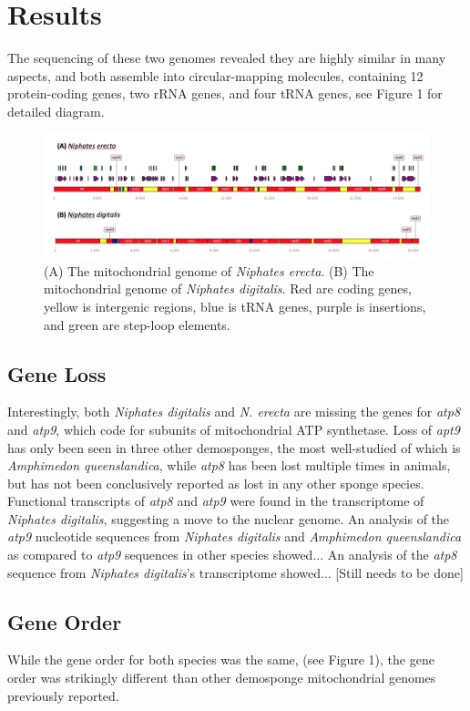 \documentclass[../main.tex]{subfiles}
\begin{document}
\section{Results}

The sequencing of these two genomes revealed they are highly similar in many aspects, and both assemble into circular-mapping molecules, containing 12 protein-coding genes, two rRNA genes, and four tRNA genes, see Figure 1 for detailed diagram.

\begin{figure}[htp]
    \centering
    \includegraphics[width=1.0\textwidth]{Figures/figure 1.png}
    \caption{(A) The mitochondrial genome of \emph{Niphates erecta}. (B) The mitochondrial genome of \emph{Niphates digitalis}. Red are coding genes, yellow is intergenic regions, blue is tRNA genes, purple is insertions, and green are step-loop elements.}
\end{figure}

\subsection{Gene Loss}
Interestingly, both \emph{Niphates digitalis} and \emph{N. erecta} are missing the genes for \emph{atp8} and \emph{atp9}, which code for subunits of mitochondrial ATP synthetase. Loss of \emph{apt9} has only been seen in three other demosponges, the most well-studied of which is \emph{Amphimedon queenslandica}, while \emph{atp8} has been lost multiple times in animals, but has not been conclusively reported as lost in any other sponge species. 
Functional transcripts of \emph{atp8} and \emph{atp9} were found in the transcriptome of \emph{Niphates digitalis}, suggesting a move to the nuclear genome. An analysis of the \emph{atp9} nucleotide sequences from \emph{Niphates digitalis} and \emph{Amphimedon queenslandica} as compared to \emph{atp9} sequences in other species showed... An analysis of the \emph{atp8} sequence from \emph{Niphates digitalis}'s transcriptome showed... [Still needs to be done]

\subsection{Gene Order}
While the gene order for both species was the same, (see Figure 1), the gene order was strikingly different than other demosponge mitochondrial genomes previously reported. 
\end{document}
